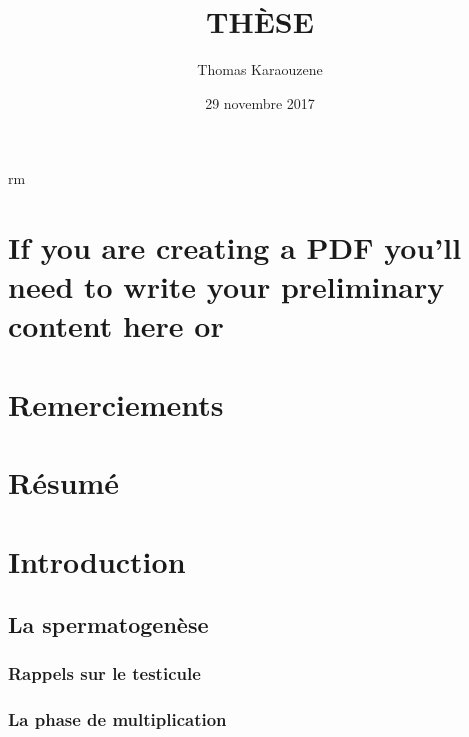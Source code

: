 \documentclass[12pt,a4paper,twoside]{ugathesis}
\title{THÈSE}
\author{Thomas Karaouzene}
\date{29 novembre 2017}
\begin{document}
  \maketitle

\frontmatter %
\pagestyle{empty} %



  \hypersetup{linkcolor=black}
  \setcounter{tocdepth}{3}
  \tableofcontents

  \listoftables

  \listoffigures
rm 


\mainmatter %
\pagestyle{fancyplain} %

\chapter{If you are creating a PDF you'll need to write your preliminary
content here
or}\label{if-you-are-creating-a-pdf-youll-need-to-write-your-preliminary-content-here-or}

\chapter*{Remerciements}\label{remerciements}

\chapter*{Résumé}\label{resume}

\chapter{Introduction}\label{introInf}

\section{La spermatogenèse}\label{la-spermatogenese}

\subsection{Rappels sur le testicule}\label{rappels-sur-le-testicule}

\subsection{La phase de
multiplication}\label{la-phase-de-multiplication}
\end{document}
